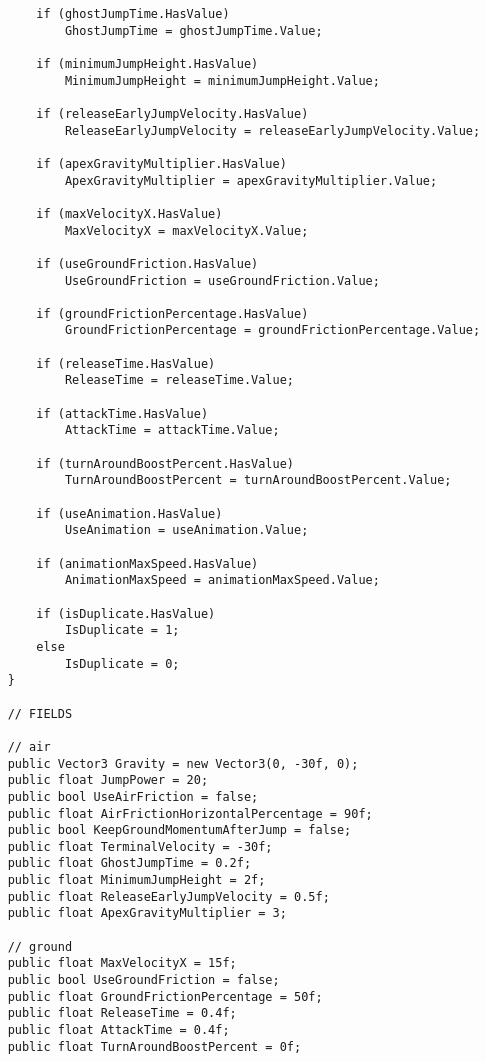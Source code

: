 \begin{lstlisting}
        if (ghostJumpTime.HasValue)
            GhostJumpTime = ghostJumpTime.Value;

        if (minimumJumpHeight.HasValue)      
            MinimumJumpHeight = minimumJumpHeight.Value;

        if (releaseEarlyJumpVelocity.HasValue)      
            ReleaseEarlyJumpVelocity = releaseEarlyJumpVelocity.Value;

        if (apexGravityMultiplier.HasValue)      
            ApexGravityMultiplier = apexGravityMultiplier.Value;

        if (maxVelocityX.HasValue)      
            MaxVelocityX = maxVelocityX.Value;

        if (useGroundFriction.HasValue)      
            UseGroundFriction = useGroundFriction.Value;

        if (groundFrictionPercentage.HasValue)      
            GroundFrictionPercentage = groundFrictionPercentage.Value;

        if (releaseTime.HasValue)      
            ReleaseTime = releaseTime.Value;

        if (attackTime.HasValue)      
            AttackTime = attackTime.Value;

        if (turnAroundBoostPercent.HasValue)      
            TurnAroundBoostPercent = turnAroundBoostPercent.Value;

        if (useAnimation.HasValue)      
            UseAnimation = useAnimation.Value;

        if (animationMaxSpeed.HasValue)      
            AnimationMaxSpeed = animationMaxSpeed.Value;

        if (isDuplicate.HasValue)
            IsDuplicate = 1;
        else
            IsDuplicate = 0;
    }

    // FIELDS

    // air
    public Vector3 Gravity = new Vector3(0, -30f, 0);
    public float JumpPower = 20;
    public bool UseAirFriction = false;
    public float AirFrictionHorizontalPercentage = 90f;
    public bool KeepGroundMomentumAfterJump = false;
    public float TerminalVelocity = -30f;
    public float GhostJumpTime = 0.2f;
    public float MinimumJumpHeight = 2f;
    public float ReleaseEarlyJumpVelocity = 0.5f;
    public float ApexGravityMultiplier = 3;

    // ground
    public float MaxVelocityX = 15f;
    public bool UseGroundFriction = false;
    public float GroundFrictionPercentage = 50f;
    public float ReleaseTime = 0.4f;
    public float AttackTime = 0.4f;
    public float TurnAroundBoostPercent = 0f;


\end{lstlisting}
